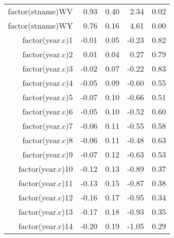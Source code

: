 \begin{table}[ht]
\begin{tabular}{rrrrr}
  factor(stname)WV & 0.93 & 0.40 & 2.34 & 0.02 \\ 
  factor(stname)WY & 0.76 & 0.16 & 4.61 & 0.00 \\ 
  factor(year.c)1 & -0.01 & 0.05 & -0.23 & 0.82 \\ 
  factor(year.c)2 & 0.01 & 0.04 & 0.27 & 0.79 \\ 
  factor(year.c)3 & -0.02 & 0.07 & -0.22 & 0.83 \\ 
  factor(year.c)4 & -0.05 & 0.09 & -0.60 & 0.55 \\ 
  factor(year.c)5 & -0.07 & 0.10 & -0.66 & 0.51 \\ 
  factor(year.c)6 & -0.05 & 0.10 & -0.52 & 0.60 \\ 
  factor(year.c)7 & -0.06 & 0.11 & -0.55 & 0.58 \\ 
  factor(year.c)8 & -0.06 & 0.11 & -0.48 & 0.63 \\ 
  factor(year.c)9 & -0.07 & 0.12 & -0.63 & 0.53 \\ 
  factor(year.c)10 & -0.12 & 0.13 & -0.89 & 0.37 \\ 
  factor(year.c)11 & -0.13 & 0.15 & -0.87 & 0.38 \\ 
  factor(year.c)12 & -0.16 & 0.17 & -0.95 & 0.34 \\ 
  factor(year.c)13 & -0.17 & 0.18 & -0.93 & 0.35 \\ 
  factor(year.c)14 & -0.20 & 0.19 & -1.05 & 0.29 \\ 
   \hline
\end{tabular}
\end{table}
